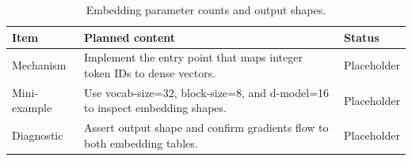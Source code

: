 \begin{table}[H]
\centering
\caption{Embedding parameter counts and output shapes.}
\label{tab:ch02-token-and-position-embeddings}
\begin{tabularx}{\textwidth}{p{}X p{}}
\toprule
Item & Planned content & Status \\
\midrule
Mechanism & Implement the entry point that maps integer token IDs to dense vectors. & Placeholder \\
Mini-example & Use vocab-size=32, block-size=8, and d-model=16 to inspect embedding shapes. & Placeholder \\
Diagnostic & Assert output shape and confirm gradients flow to both embedding tables. & Placeholder \\
\bottomrule
\end{tabularx}
\end{table}
